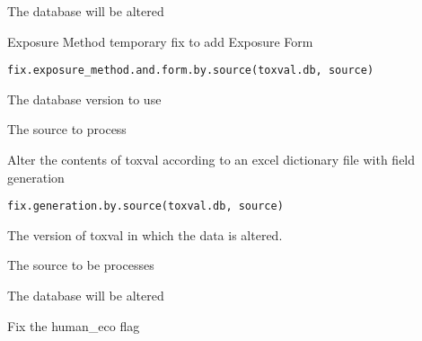 \documentclass[letterpaper]{book}
\begin{document}
%
\begin{Value}
The database will be altered
\end{Value}
%
\begin{Description}\relax
Exposure Method temporary fix to add Exposure Form
\end{Description}
%
\begin{Usage}
\begin{verbatim}
fix.exposure_method.and.form.by.source(toxval.db, source)
\end{verbatim}
\end{Usage}
%
\begin{Arguments}
\begin{ldescription}
\item[\code{toxval.db}] The database version to use

\item[\code{source}] The source to process
\end{ldescription}
\end{Arguments}
%
\begin{Description}\relax
Alter the contents of toxval according to an excel dictionary file with field generation
\end{Description}
%
\begin{Usage}
\begin{verbatim}
fix.generation.by.source(toxval.db, source)
\end{verbatim}
\end{Usage}
%
\begin{Arguments}
\begin{ldescription}
\item[\code{toxval.db}] The version of toxval in which the data is altered.

\item[\code{source}] The source to be processes
\end{ldescription}
\end{Arguments}
%
\begin{Value}
The database will be altered
\end{Value}
%
\begin{Description}\relax
Fix the human\_eco flag
\end{Description}
\end{document}

